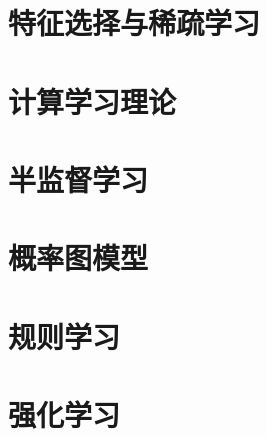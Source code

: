 \documentclass{ctexart}
\begin{document}
			\section{特征选择与稀疏学习}
			\section{计算学习理论}
			\section{半监督学习}
			\section{概率图模型}
			\section{规则学习}
			\section{强化学习}
			
\end{document}
